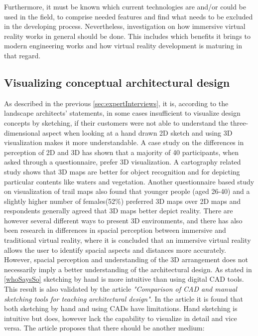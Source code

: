 		Furthermore, it must be known which current technologies are and/or could be used in the field, to comprise needed features and find what needs to be excluded in the developing process. Nevertheless, investigation on how immersive virtual reality works in general should be done. This includes which benefits it brings to modern engineering works and how virtual reality development is maturing in that regard.		
			
	
			\subsection{Visualizing conceptual architectural design}
			\label{sec:immersion}
			As described in the previous \autoref{sec:expertInterviews}, it is, according to the landscape architects' statements, in some cases insufficient to visualize design concepts by sketching, if their customers were not able to understand the three-dimensional aspect when looking at a hand drawn 2D sketch and using 3D visualization makes it more understandable. A case study on the differences in perception of 2D and 3D\cite{2Dvs3D} has shown that a majority of 40 participants, when asked through a  questionnaire, prefer 3D visualization. A cartography related study shows that 3D maps are better for object recognition and for depicting particular contents like waters and vegetation\cite{2Dvs3DobjectRecognition}. Another questionnaire based study on visualization of trail maps also found that younger people (aged 26-40) and a slightly higher number of females(52\%) preferred 3D maps over 2D maps\cite{2Dvs3DtrailMaps} and respondents generally agreed that 3D maps better depict reality. There are however several different ways to present 3D environments, and there has also been research in differences in spacial perception between immersive and traditional virtual reality\cite{immersive3DModel}, where it is concluded that an immersive virtual reality allows the user to identify spacial aspects and distances more accurately. However, spacial perception and understanding of the 3D arrangement does not necessarily imply a better understanding of the architectural design. As stated in \autoref{whoSaysSo} sketching by hand is more intuitive than using digital CAD tools. This result is also validated by the article \textit{"Comparison of CAD and manual sketching tools for teaching architectural design"}\cite{sketchingVsCAD}. In the article it is found that both sketching by hand and using CADs have limitations. Hand sketching is intuitive but does, however lack the capability to visualize in detail and vice versa. The article proposes that there should be another medium:\\
			
